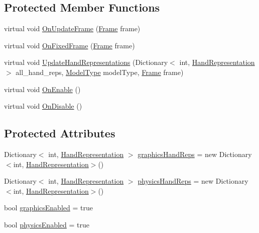 \subsection*{Protected Member Functions}
\begin{DoxyCompactItemize}
\item 
virtual void \mbox{\hyperlink{class_leap_1_1_unity_1_1_hand_model_manager_ad446a51a6956db5c0e30dd4c96981180}{On\+Update\+Frame}} (\mbox{\hyperlink{class_leap_1_1_frame}{Frame}} frame)
\item 
virtual void \mbox{\hyperlink{class_leap_1_1_unity_1_1_hand_model_manager_a0cc5990ef601cb9ba48b6121b535d7b0}{On\+Fixed\+Frame}} (\mbox{\hyperlink{class_leap_1_1_frame}{Frame}} frame)
\item 
virtual void \mbox{\hyperlink{class_leap_1_1_unity_1_1_hand_model_manager_a79e87a3a32fdef95f497a081dae1f533}{Update\+Hand\+Representations}} (Dictionary$<$ int, \mbox{\hyperlink{class_leap_1_1_unity_1_1_hand_representation}{Hand\+Representation}} $>$ all\+\_\+hand\+\_\+reps, \mbox{\hyperlink{namespace_leap_1_1_unity_a186e5eb0a2b743f1f6b79346f0ab8ad0}{Model\+Type}} model\+Type, \mbox{\hyperlink{class_leap_1_1_frame}{Frame}} frame)
\item 
virtual void \mbox{\hyperlink{class_leap_1_1_unity_1_1_hand_model_manager_a87325bb4c2915d284d41bef44c184e7e}{On\+Enable}} ()
\item 
virtual void \mbox{\hyperlink{class_leap_1_1_unity_1_1_hand_model_manager_acfa3a4f4ce4f87260bffecfd3aad8ed9}{On\+Disable}} ()
\end{DoxyCompactItemize}
\subsection*{Protected Attributes}
\begin{DoxyCompactItemize}
\item 
Dictionary$<$ int, \mbox{\hyperlink{class_leap_1_1_unity_1_1_hand_representation}{Hand\+Representation}} $>$ \mbox{\hyperlink{class_leap_1_1_unity_1_1_hand_model_manager_a3966c995e00f366b661342a1c1ac371d}{graphics\+Hand\+Reps}} = new Dictionary$<$int, \mbox{\hyperlink{class_leap_1_1_unity_1_1_hand_representation}{Hand\+Representation}}$>$()
\item 
Dictionary$<$ int, \mbox{\hyperlink{class_leap_1_1_unity_1_1_hand_representation}{Hand\+Representation}} $>$ \mbox{\hyperlink{class_leap_1_1_unity_1_1_hand_model_manager_aac82ec7320cd24f524a2690ae0e27750}{physics\+Hand\+Reps}} = new Dictionary$<$int, \mbox{\hyperlink{class_leap_1_1_unity_1_1_hand_representation}{Hand\+Representation}}$>$()
\item 
bool \mbox{\hyperlink{class_leap_1_1_unity_1_1_hand_model_manager_a5237173e0a7be15ea36e0e35830b22a7}{graphics\+Enabled}} = true
\item 
bool \mbox{\hyperlink{class_leap_1_1_unity_1_1_hand_model_manager_aa86eb54a713c69895ab326bea1ef0718}{physics\+Enabled}} = true
\end{DoxyCompactItemize}
